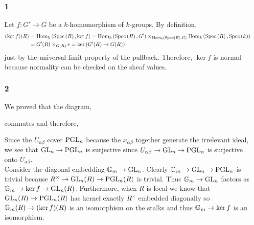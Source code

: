 \documentclass[12pt]{article}
\begin{document}
\subsubsection{1}

Let $f : G' \to G$ be a $k$-homomorphism of $k$-groups.
By definition,
\begin{align*}
(\ker{f})(R) &= \mathrm{Hom}_{k} \left( \mathrm{Spec}\left( R \right), \ker{f} \right) = \mathrm{Hom}_{k} \left( \mathrm{Spec}\left( R \right), G' \right) \times_{\mathrm{Hom}_{k} \left( \mathrm{Spec}\left( R \right), G \right)} \mathrm{Hom}_{k} \left( \mathrm{Spec}\left( R \right), \mathrm{Spec}\left( k \right) \right) 
\\
&= G'(R) \times_{G(R)} e = \ker{(G'(R) \to G(R))}
\end{align*}
just by the universal limit property of the pullback. Therefore, $\ker{f}$ is normal because normality can be checked on the sheaf values.

\subsubsection{2}

We proved that the diagram,
\begin{center}
\end{center}
commutes and therefore,
\begin{center}
\end{center}
Since the $U_{\alpha \beta}$ cover $\mathrm{PGL}_n$ because the $x_{\alpha \beta}$ together generate the irrelevant ideal, we see that $\mathrm{GL}_n \to \mathrm{PGL}_n$ is surjective since $U_{\alpha \beta} \to \mathrm{GL}_n \to \mathrm{PGL}_n$ is surjective onto $U_{\alpha \beta}$. 
\bigskip\\
Consider the diagonal embedding ${\mathbb{G}_m} \to \mathrm{GL}_n$. Clearly ${\mathbb{G}_m} \to \mathrm{GL}_n \to \mathrm{PGL}_n$ is trivial because $R^\times \to \mathrm{GL}_n(R) \to \mathrm{PGL}_n(R)$ is trivial. Thus ${\mathbb{G}_m} \to \mathrm{GL}_n$ factors as ${\mathbb{G}_m} \to \ker{f} \to \mathrm{GL}_n(R)$. Furthermore, when $R$ is local we know that $\mathrm{GL}_n(R) \to \mathrm{PGL}_n(R)$ has kernel exactly $R^\times$ embedded diagonally so ${\mathbb{G}_m}(R) \to (\ker{f})(R)$ is an isomorphism on the stalks and thus ${\mathbb{G}_m} \to \ker{f}$ is an isomorphism.
\end{document}
